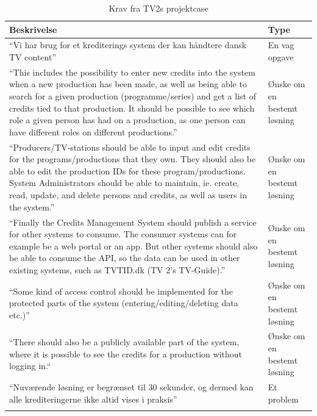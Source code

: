 \begin{longtable}{|p{12cm}|p{4cm}|}
\hline
\textbf{Beskrivelse} & \textbf{Type} \\
\hline
“Vi har brug for  et krediterings system der kan  håndtere  dansk TV content” 
& En vag opgave \\

\hline
“This includes the possibility to enter new credits into the system when a new production has been made, as well as being able to search for a given production (programme/series) and get a list of credits tied to that production. It should be possible to see which role a given person has had on a production, as one person can have different roles on different productions.” 
& Ønske om en bestemt løsning \\

\hline 
“Producers/TV-stations should be able to input and edit credits for the programs/productions that they own. They should also be able to edit the production IDs for these program/productions. System Administrators should be able to maintain, ie. create, read, update, and delete persons and credits, as well as users in the system.” 
& Ønske om en bestemt løsning \\

\hline
“Finally the Credits Management System should publish a service for other systems to consume. The consumer systems can for example be a web portal or an app. But other systems should also be able to consume the API, so the data can be used in other existing systems, such as TVTID.dk (TV 2’s TV-Guide).”
& Ønske om en bestemt løsning \\

\hline
“Some kind of access control should be implemented for the protected parts of the system (entering/editing/deleting data etc.)” 
& Ønske om en bestemt løsning \\

\hline
“There should also be a publicly available part of the system, where it is possible to see the credits for a production without logging in.“ 
& Ønske om en bestemt løsning \\

\hline
“Nuværende løsning er begrænset til 30 sekunder, og dermed kan alle krediteringerne ikke altid vises i praksis” 
& Et problem \\

\hline
\caption{Krav fra TV2s projektcase}
\label{table:kravFraCase}
\end{longtable}


